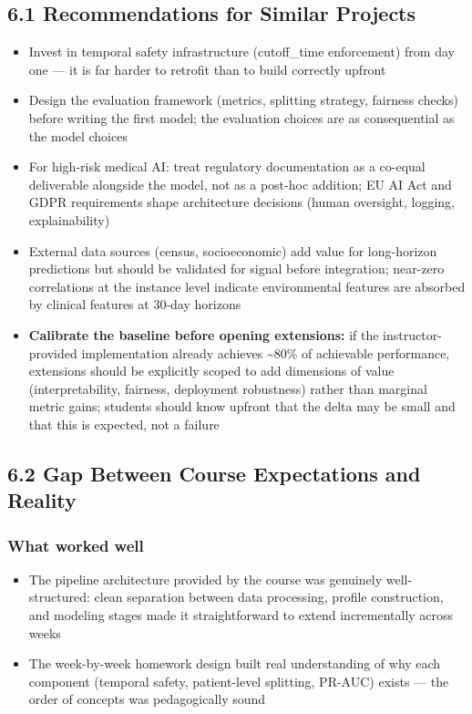 \documentclass[11pt,a4paper]{article}
\begin{document}
\subsection{6.1 Recommendations for Similar Projects}
\begin{itemize}
\item Invest in temporal safety infrastructure (cutoff\_time enforcement) from day one --- it is far harder to retrofit than to build correctly upfront
\item Design the evaluation framework (metrics, splitting strategy, fairness checks) before writing the first model; the evaluation choices are as consequential as the model choices
\item For high-risk medical AI: treat regulatory documentation as a co-equal deliverable alongside the model, not as a post-hoc addition; EU AI Act and GDPR requirements shape architecture decisions (human oversight, logging, explainability)
\item External data sources (census, socioeconomic) add value for long-horizon predictions but should be validated for signal before integration; near-zero correlations at the instance level indicate environmental features are absorbed by clinical features at 30-day horizons
\item \textbf{Calibrate the baseline before opening extensions:} if the instructor-provided implementation already achieves \textasciitilde{}80\% of achievable performance, extensions should be explicitly scoped to add dimensions of value (interpretability, fairness, deployment robustness) rather than marginal metric gains; students should know upfront that the delta may be small and that this is expected, not a failure
\end{itemize}

\subsection{6.2 Gap Between Course Expectations and Reality}

\subsubsection{What worked well}
\begin{itemize}
\item The pipeline architecture provided by the course was genuinely well-structured: clean separation between data processing, profile construction, and modeling stages made it straightforward to extend incrementally across weeks
\item The week-by-week homework design built real understanding of why each component (temporal safety, patient-level splitting, PR-AUC) exists --- the order of concepts was pedagogically sound
\end{itemize}
\end{document}
